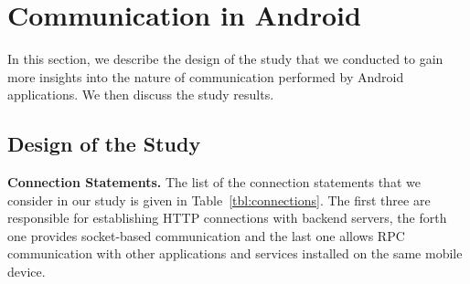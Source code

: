 \begin{table}[t]
\caption{Considered Connection Statements.}
\label{tbl:connections}
\centering
\tabcolsep=1.5pt
\end{table}




\section{Communication in Android}
\label{sec:study} 

In this section, we describe the design of the study that we conducted to gain more insights into the nature of communication performed by Android applications. We then discuss the study results. 

\subsection{Design of the Study}

\vspace{0.1in}
\noindent 
{\bf Connection Statements.}
The list of the connection statements that we consider in our study is given in Table~\ref{tbl:connections}.
The first three are responsible for establishing HTTP connections with backend servers, the forth one provides socket-based communication and the last one allows 
RPC communication with other applications and services installed on the same mobile device. 


